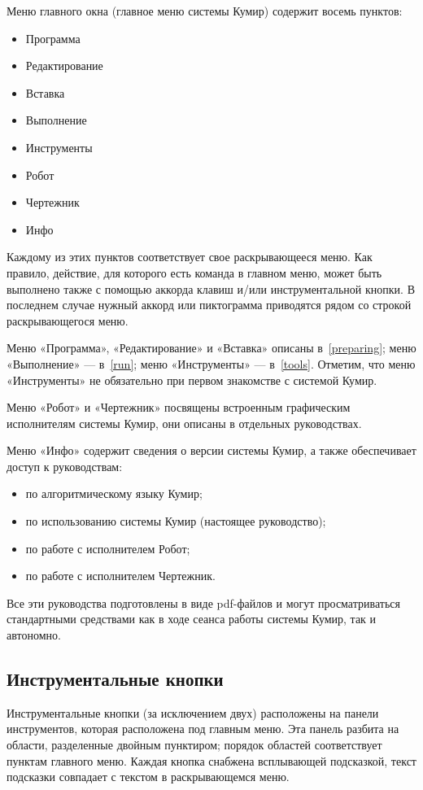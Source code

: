 \documentclass[12pt,a4paper]{article}
\begin{document}
Меню главного окна (главное меню системы Кумир) содержит восемь пунктов:
\begin{itemize}
\item	Программа
\item	Редактирование
\item	Вставка
\item	Выполнение
\item	Инструменты
\item	Робот
\item	Чертежник
\item	Инфо
\end{itemize}

Каждому из этих пунктов соответствует свое раскрывающееся меню. Как правило, действие, для которого есть команда в главном меню,  может быть выполнено также с помощью аккорда клавиш и/или инструментальной кнопки. В последнем случае нужный аккорд или пиктограмма приводятся рядом со строкой раскрывающегося меню. 

Меню «Программа», «Редактирование» и «Вставка» описаны в~\ref{preparing}; меню «Выполнение» --- в~\ref{run}; меню «Инструменты» --- в~\ref{tools}. Отметим, что меню «Инструменты» не обязательно при первом знакомстве с системой Кумир.

Меню «Робот» и «Чертежник» посвящены встроенным графическим исполнителям системы Кумир, они описаны в отдельных руководствах.

Меню «Инфо» содержит сведения о версии системы Кумир, а также обеспечивает доступ к руководствам:
\begin{itemize}
\item по алгоритмическому языку Кумир;
\item по использованию системы Кумир (настоящее руководство);
\item по работе с исполнителем Робот;
\item по работе с исполнителем Чертежник.
\end{itemize}

Все эти руководства подготовлены в виде pdf-файлов и могут просматриваться стандартными средствами как в ходе сеанса работы системы Кумир, так и автономно.

\subsection{Инструментальные кнопки}

Инструментальные кнопки (за исключением двух) расположены на панели инструментов, которая расположена под главным меню. Эта панель разбита на области, разделенные двойным пунктиром; порядок областей соответствует пунктам главного меню. Каждая кнопка снабжена всплывающей подсказкой, текст подсказки совпадает с текстом в раскрывающемся меню.
\end{document}
